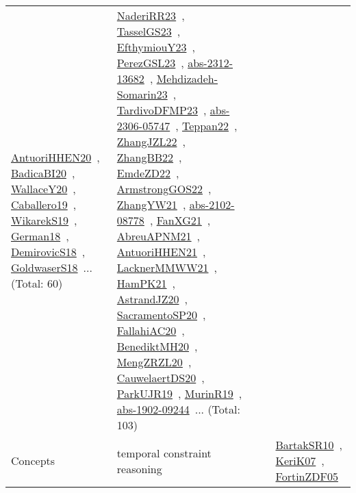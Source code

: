 {\begin{longtable}{lp{3cm}>{\raggedright\arraybackslash}p{6cm}>{\raggedright\arraybackslash}p{6cm}>{\raggedright\arraybackslash}p{8cm}}
\href{works/AntuoriHHEN20.pdf}{AntuoriHHEN20}~\cite{AntuoriHHEN20}, \href{works/BadicaBI20.pdf}{BadicaBI20}~\cite{BadicaBI20}, \href{works/WallaceY20.pdf}{WallaceY20}~\cite{WallaceY20}, \href{works/Caballero19.pdf}{Caballero19}~\cite{Caballero19}, \href{works/WikarekS19.pdf}{WikarekS19}~\cite{WikarekS19}, \href{works/German18.pdf}{German18}~\cite{German18}, \href{works/DemirovicS18.pdf}{DemirovicS18}~\cite{DemirovicS18}, \href{works/GoldwaserS18.pdf}{GoldwaserS18}~\cite{GoldwaserS18}... (Total: 60) & \href{works/NaderiRR23.pdf}{NaderiRR23}~\cite{NaderiRR23}, \href{works/TasselGS23.pdf}{TasselGS23}~\cite{TasselGS23}, \href{works/EfthymiouY23.pdf}{EfthymiouY23}~\cite{EfthymiouY23}, \href{works/PerezGSL23.pdf}{PerezGSL23}~\cite{PerezGSL23}, \href{works/abs-2312-13682.pdf}{abs-2312-13682}~\cite{abs-2312-13682}, \href{works/Mehdizadeh-Somarin23.pdf}{Mehdizadeh-Somarin23}~\cite{Mehdizadeh-Somarin23}, \href{works/TardivoDFMP23.pdf}{TardivoDFMP23}~\cite{TardivoDFMP23}, \href{works/abs-2306-05747.pdf}{abs-2306-05747}~\cite{abs-2306-05747}, \href{works/Teppan22.pdf}{Teppan22}~\cite{Teppan22}, \href{works/ZhangJZL22.pdf}{ZhangJZL22}~\cite{ZhangJZL22}, \href{works/ZhangBB22.pdf}{ZhangBB22}~\cite{ZhangBB22}, \href{works/EmdeZD22.pdf}{EmdeZD22}~\cite{EmdeZD22}, \href{works/ArmstrongGOS22.pdf}{ArmstrongGOS22}~\cite{ArmstrongGOS22}, \href{works/ZhangYW21.pdf}{ZhangYW21}~\cite{ZhangYW21}, \href{works/abs-2102-08778.pdf}{abs-2102-08778}~\cite{abs-2102-08778}, \href{works/FanXG21.pdf}{FanXG21}~\cite{FanXG21}, \href{works/AbreuAPNM21.pdf}{AbreuAPNM21}~\cite{AbreuAPNM21}, \href{works/AntuoriHHEN21.pdf}{AntuoriHHEN21}~\cite{AntuoriHHEN21}, \href{works/LacknerMMWW21.pdf}{LacknerMMWW21}~\cite{LacknerMMWW21}, \href{works/HamPK21.pdf}{HamPK21}~\cite{HamPK21}, \href{works/AstrandJZ20.pdf}{AstrandJZ20}~\cite{AstrandJZ20}, \href{works/SacramentoSP20.pdf}{SacramentoSP20}~\cite{SacramentoSP20}, \href{works/FallahiAC20.pdf}{FallahiAC20}~\cite{FallahiAC20}, \href{works/BenediktMH20.pdf}{BenediktMH20}~\cite{BenediktMH20}, \href{works/MengZRZL20.pdf}{MengZRZL20}~\cite{MengZRZL20}, \href{works/CauwelaertDS20.pdf}{CauwelaertDS20}~\cite{CauwelaertDS20}, \href{works/ParkUJR19.pdf}{ParkUJR19}~\cite{ParkUJR19}, \href{works/MurinR19.pdf}{MurinR19}~\cite{MurinR19}, \href{works/abs-1902-09244.pdf}{abs-1902-09244}~\cite{abs-1902-09244}... (Total: 103)\\
Concepts & temporal constraint reasoning &  &  & \href{works/BartakSR10.pdf}{BartakSR10}~\cite{BartakSR10}, \href{works/KeriK07.pdf}{KeriK07}~\cite{KeriK07}, \href{works/FortinZDF05.pdf}{FortinZDF05}~\cite{FortinZDF05}\\

\end{longtable}}
